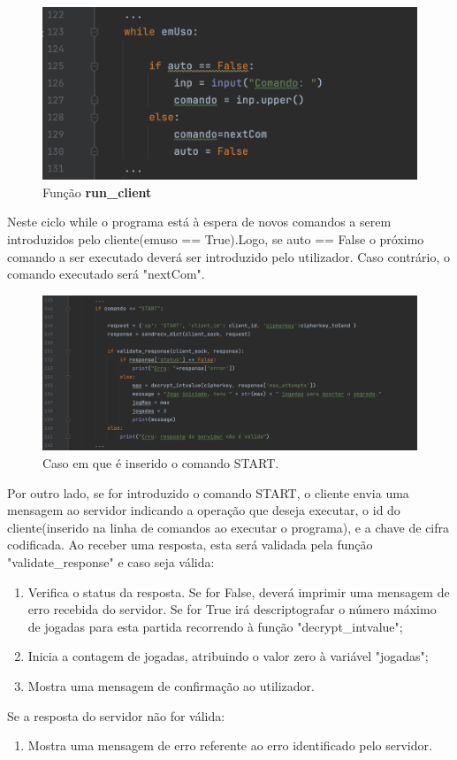 \documentclass{report}
\begin{document}
\begin{figure}[H]
        \centering
        \includegraphics[scale=0.43]{runclient2}      
        \caption{Função \textbf{run\_client}}
\end{figure}
Neste ciclo while o programa está à espera de novos comandos a serem introduzidos pelo cliente(emuso == True).Logo, se auto == False o próximo comando a ser executado deverá ser introduzido pelo utilizador. Caso contrário, o comando executado será "nextCom".

\begin{figure}[H]
        \centering
        \includegraphics[scale=0.43]{start}      
        \caption{Caso em que é inserido o comando START.}
\end{figure}
Por outro lado, se for introduzido o comando START, o cliente envia uma mensagem ao servidor indicando a operação que deseja executar, o id do cliente(inserido na linha de comandos ao executar o programa), e a chave de cifra codificada. Ao receber uma resposta, esta será validada pela função "validate\_response" e caso seja válida: 
\begin{enumerate}
\item Verifica o status da resposta. Se for False, deverá imprimir uma mensagem de erro recebida do servidor. Se for True irá descriptografar o número máximo de jogadas para esta partida recorrendo à função "decrypt\_intvalue";
\item Inicia a contagem de jogadas, atribuindo o valor zero à variável "jogadas";
\item Mostra uma mensagem de confirmação ao utilizador.
\end{enumerate}
Se a resposta do servidor não for válida:
\begin{enumerate}
\item Mostra uma mensagem de erro referente ao erro identificado pelo servidor.
\end{enumerate}
\end{document}
